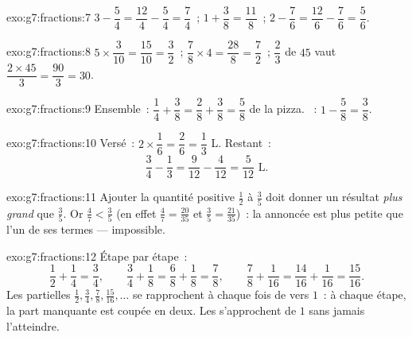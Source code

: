 \begin{solution}{exo:g7:fractions:7}
$3 - \dfrac54 = \dfrac{12}{4} - \dfrac54 = \dfrac74$~; \quad
$1 + \dfrac38 = \dfrac{11}{8}$~; \quad
$2 - \dfrac76 = \dfrac{12}{6} - \dfrac76 = \dfrac56$.
\end{solution}

\begin{solution}{exo:g7:fractions:8}
$5 \times \dfrac{3}{10} = \dfrac{15}{10} = \dfrac32$~; \quad
$\dfrac78 \times 4 = \dfrac{28}{8} = \dfrac72$~; \quad
$\dfrac23$ de $45$ vaut $\dfrac{2 \times 45}{3} = \dfrac{90}{3} = 30$.
\end{solution}

\begin{solution}{exo:g7:fractions:9}
Ensemble~: $\dfrac14 + \dfrac38 = \dfrac28 + \dfrac38 = \dfrac58$ de
la pizza. ~: $1 - \dfrac58 = \dfrac38$.
\end{solution}

\begin{solution}{exo:g7:fractions:10}
Versé~: $2 \times \dfrac16 = \dfrac26 = \dfrac13$ L. Restant~:
\[
\frac34 - \frac13 = \frac{9}{12} - \frac{4}{12} = \frac{5}{12}
\text{ L}.
\]
\end{solution}

\begin{solution}{exo:g7:fractions:11}
Ajouter la quantité positive $\frac12$ à $\frac35$ doit donner un
résultat \emph{plus grand} que $\frac35$. Or $\frac47 < \frac35$
(en effet $\frac47 = \frac{20}{35}$ et $\frac35 = \frac{21}{35}$)~: la
 annoncée est plus petite que l'un de ses termes --- impossible.
\end{solution}

\begin{solution}{exo:g7:fractions:12}
Étape par étape~:
\[
\frac12 + \frac14 = \frac34, \qquad
\frac34 + \frac18 = \frac68 + \frac18 = \frac78, \qquad
\frac78 + \frac1{16} = \frac{14}{16} + \frac1{16} = \frac{15}{16}.
\]
Les  partielles $\frac12, \frac34, \frac78, \frac{15}{16},
\dots$ se rapprochent à chaque fois de  vers $1$~: à chaque
étape, la part manquante est coupée en deux. Les  s'approchent
de $1$ sans jamais l'atteindre.
\end{solution}

